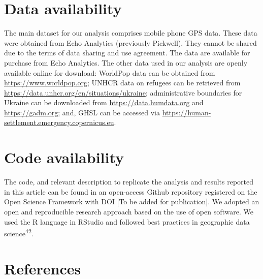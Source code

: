 \documentclass[
  11pt,
]{article}
\begin{document}
\section{Data availability}\label{data-availability}

The main dataset for our analysis comprises mobile phone GPS data. These
data were obtained from Echo Analytics (previously Pickwell). They
cannot be shared due to the terms of data sharing and use agreement. The
data are available for purchase from Echo Analytics. The other data used
in our analysis are openly available online for download: WorldPop data
can be obtained from \url{https://www.worldpop.org}; UNHCR data on
refugees can be retrieved from
\url{https://data.unhcr.org/en/situations/ukraine}; administrative
boundaries for Ukraine can be downloaded from
\url{https://data.humdata.org} and \url{https://gadm.org}; and, GHSL can
be accessed via \url{https://human-settlement.emergency.copernicus.eu}.

\section{Code availability}\label{code-availability}

The code, and relevant description to replicate the analysis and results
reported in this article can be found in an open-access Github
repository registered on the Open Science Framework with DOI {[}To be
added for publication{]}. We adopted an open and reproducible research
approach based on the use of open software. We used the R language in
RStudio and followed best practices in geographic data
science\textsuperscript{42}.

\section*{References}\label{references}
\end{document}
